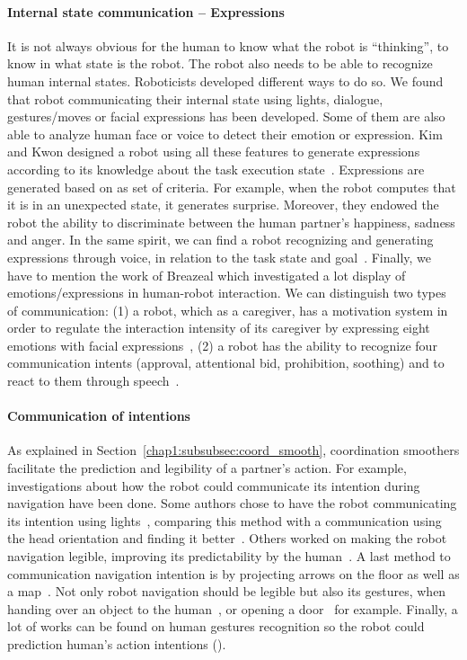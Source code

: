 \documentclass[a4paper,11pt,twoside]{StyleThese}
\begin{document}
\paragraph{Internal state communication -- Expressions}
It is not always obvious for the human to know what the robot is ``thinking'', \ie to know in what state is the robot. The robot also needs to be able to recognize human internal states. Roboticists developed different ways to do so. We found that robot communicating their internal state using lights, dialogue, gestures/moves or facial expressions has been developed. Some of them are also able to analyze human face or voice to detect their emotion or expression. Kim and Kwon designed a robot using all these features to generate expressions according to its knowledge about the task execution state~\cite{kim_2010_computational}. Expressions are generated based on as set of criteria. For example, when the robot computes that it is in an unexpected state, it generates surprise. Moreover, they endowed the robot the ability to discriminate between the human partner's happiness, sadness and anger. In the same spirit, we can find a robot recognizing and generating expressions through voice, in relation to the task state and goal~\cite{scheutz_2006_utility}. Finally, we have to mention the work of Breazeal which investigated a lot display of emotions/expressions in human-robot interaction. We can distinguish two types of communication: (1) a robot, which as a caregiver, has a motivation system in order to regulate the interaction intensity of its caregiver by expressing eight emotions with facial expressions~\cite{breazeal_1998_motivational, breazeal_2004_function}, (2) a robot has the ability to recognize four communication intents (approval, attentional bid, prohibition, soothing) and to react to them through speech~\cite{breazeal_2002_regulation, breazeal_2003_emotion}.

\paragraph{Communication of intentions} As explained in Section~\ref{chap1:subsubsec:coord_smooth}, coordination smoothers facilitate the prediction and legibility of a partner's action. For example, investigations about how the robot could communicate its intention during navigation have been done. Some authors chose to have the robot communicating its intention using lights~\cite{szafir_2015_communicating}, comparing this method with a communication using the head orientation and finding it better~\cite{may_2015_show}. Others worked on making the robot navigation legible, improving its predictability by the human~\cite{dragan_2013_legibility, alami_2006_toward}. A last method to communication navigation intention is by projecting arrows on the floor as well as a map~\cite{chadalavada_2015_mind, coovert_2014_spatial}.  Not only robot navigation should be legible but also its gestures, when handing over an object to the human~\cite{sisbot_2012_human}, or opening a door~\cite{takayama_2011_expressing} for example. Finally, a lot of works can be found on human gestures recognition so the robot could prediction human's action intentions (\eg\cite{barros_2017_dynamic, chang_2018_effects}).
\end{document}
